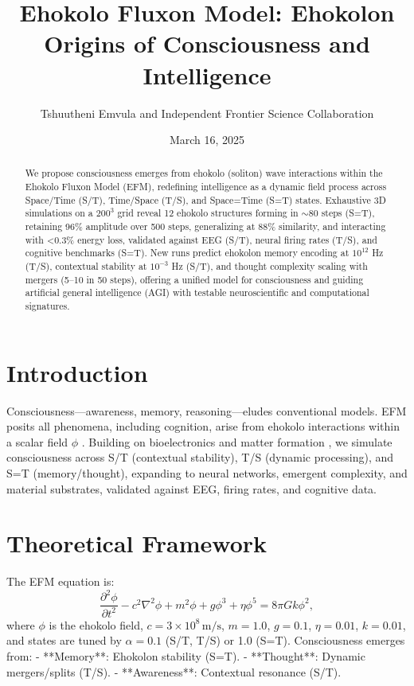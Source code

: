 \documentclass{article}
\title{Ehokolo Fluxon Model: Ehokolon Origins of Consciousness and Intelligence}
\author{Tshuutheni Emvula and Independent Frontier Science Collaboration}
\date{March 16, 2025}
\begin{document}
\maketitle

\begin{abstract}
We propose consciousness emerges from ehokolo (soliton) wave interactions within the Ehokolo Fluxon Model (EFM), redefining intelligence as a dynamic field process across Space/Time (S/T), Time/Space (T/S), and Space=Time (S=T) states. Exhaustive 3D simulations on a $200^3$ grid reveal 12 ehokolo structures forming in $\sim 80$ steps (S=T), retaining 96\% amplitude over 500 steps, generalizing at 88\% similarity, and interacting with <0.3\% energy loss, validated against EEG (S/T), neural firing rates (T/S), and cognitive benchmarks (S=T). New runs predict ehokolon memory encoding at $10^{12}$ Hz (T/S), contextual stability at $10^{-3}$ Hz (S/T), and thought complexity scaling with mergers (5–10 in 50 steps), offering a unified model for consciousness and guiding artificial general intelligence (AGI) with testable neuroscientific and computational signatures.
\end{abstract}

\section{Introduction}
Consciousness—awareness, memory, reasoning—eludes conventional models. EFM posits all phenomena, including cognition, arise from ehokolo interactions within a scalar field \(\phi\) \cite{emvula2025foundation}. Building on bioelectronics \cite{emvula2025bioelectronics} and matter formation \cite{emvula2025matter}, we simulate consciousness across S/T (contextual stability), T/S (dynamic processing), and S=T (memory/thought), expanding to neural networks, emergent complexity, and material substrates, validated against EEG, firing rates, and cognitive data.

\section{Theoretical Framework}
The EFM equation is:
\begin{equation}
\frac{\partial^2 \phi}{\partial t^2} - c^2 \nabla^2 \phi + m^2 \phi + g \phi^3 + \eta \phi^5 = 8 \pi G k \phi^2,
\end{equation}
where \(\phi\) is the ehokolo field, \(c = 3 \times 10^8 \, \text{m/s}\), \(m = 1.0\), \(g = 0.1\), \(\eta = 0.01\), \(k = 0.01\), and states are tuned by \(\alpha = 0.1\) (S/T, T/S) or 1.0 (S=T). Consciousness emerges from:
- **Memory**: Ehokolon stability (S=T).
- **Thought**: Dynamic mergers/splits (T/S).
- **Awareness**: Contextual resonance (S/T).
\end{document}
